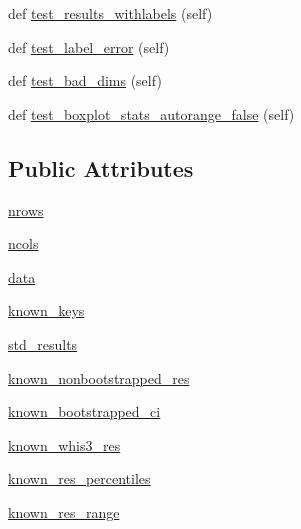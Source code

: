 \begin{DoxyCompactItemize}
\item 
def \hyperlink{classmatplotlib_1_1tests_1_1test__cbook_1_1Test__boxplot__stats_a53959a6a41fd16a80809e5a5a21f1661}{test\+\_\+results\+\_\+withlabels} (self)
\item 
def \hyperlink{classmatplotlib_1_1tests_1_1test__cbook_1_1Test__boxplot__stats_ab476535a1b7d12fb6ccbbde3b25e10fc}{test\+\_\+label\+\_\+error} (self)
\item 
def \hyperlink{classmatplotlib_1_1tests_1_1test__cbook_1_1Test__boxplot__stats_a3c2c309d7b316e3d8589b931a927c0cc}{test\+\_\+bad\+\_\+dims} (self)
\item 
def \hyperlink{classmatplotlib_1_1tests_1_1test__cbook_1_1Test__boxplot__stats_ab9392d4ecc48cb14595c780037603f13}{test\+\_\+boxplot\+\_\+stats\+\_\+autorange\+\_\+false} (self)
\end{DoxyCompactItemize}
\subsection*{Public Attributes}
\begin{DoxyCompactItemize}
\item 
\hyperlink{classmatplotlib_1_1tests_1_1test__cbook_1_1Test__boxplot__stats_a5950d4ce62e95ac67a614825ed071ad1}{nrows}
\item 
\hyperlink{classmatplotlib_1_1tests_1_1test__cbook_1_1Test__boxplot__stats_ae10d58b5adb925a81935b9e1a5cee9f2}{ncols}
\item 
\hyperlink{classmatplotlib_1_1tests_1_1test__cbook_1_1Test__boxplot__stats_a4f733c614222d2c319246102000443b0}{data}
\item 
\hyperlink{classmatplotlib_1_1tests_1_1test__cbook_1_1Test__boxplot__stats_a9c618d1eccdb4b5798eba62690e917c2}{known\+\_\+keys}
\item 
\hyperlink{classmatplotlib_1_1tests_1_1test__cbook_1_1Test__boxplot__stats_a3b4bcfe0924ab10e5c46158fd3d52736}{std\+\_\+results}
\item 
\hyperlink{classmatplotlib_1_1tests_1_1test__cbook_1_1Test__boxplot__stats_afec1243c9562d1a26a72f3bcd5a6d581}{known\+\_\+nonbootstrapped\+\_\+res}
\item 
\hyperlink{classmatplotlib_1_1tests_1_1test__cbook_1_1Test__boxplot__stats_a40fd9497c51ae99a635463eb604ef019}{known\+\_\+bootstrapped\+\_\+ci}
\item 
\hyperlink{classmatplotlib_1_1tests_1_1test__cbook_1_1Test__boxplot__stats_acf5e1855c27a0b3a2ea8fe6b7845ef65}{known\+\_\+whis3\+\_\+res}
\item 
\hyperlink{classmatplotlib_1_1tests_1_1test__cbook_1_1Test__boxplot__stats_a70a6619046f8b23faa24102c14a30ba3}{known\+\_\+res\+\_\+percentiles}
\item 
\hyperlink{classmatplotlib_1_1tests_1_1test__cbook_1_1Test__boxplot__stats_a11bfa23ebcf486ab9e87d751d2dde9e0}{known\+\_\+res\+\_\+range}
\end{DoxyCompactItemize}


